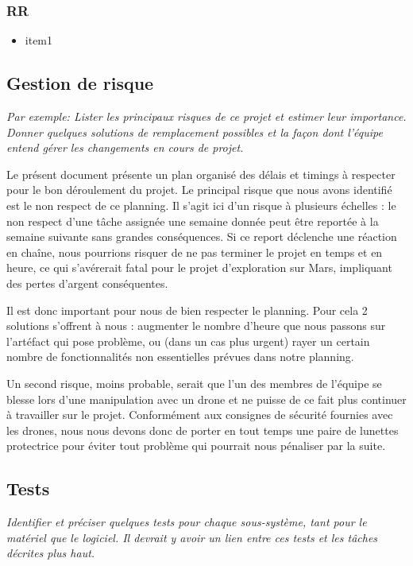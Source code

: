 \documentclass{mistcoursedoc}
\begin{document}
\subsubsection{RR}
\begin{itemize}
  \item item1
\end{itemize}

\subsection{Gestion de risque}

\textit{Par exemple: Lister les principaux risques de ce projet et estimer leur importance.  Donner quelques solutions de remplacement possibles et la façon dont l’équipe entend gérer les changements en cours de projet.}

Le présent document présente un plan organisé des délais et timings à respecter pour le bon déroulement du projet. Le principal risque que nous avons identifié est le non respect de ce planning. Il s'agit ici d'un risque à plusieurs échelles : le non respect d'une tâche assignée une semaine donnée peut être reportée à la semaine suivante sans grandes conséquences. Si ce report déclenche une réaction en chaîne, nous pourrions risquer de ne pas terminer le projet en temps et en heure, ce qui s'avérerait fatal pour le projet d'exploration sur Mars, impliquant des pertes d'argent conséquentes.

Il est donc important pour nous de bien respecter le planning. Pour cela 2 solutions s'offrent à nous : augmenter le nombre d'heure que nous passons sur l'artéfact qui pose problème, ou (dans un cas plus urgent) rayer un certain nombre de fonctionnalités non essentielles prévues dans notre planning.

Un second risque, moins probable, serait que l'un des membres de l'équipe se blesse lors d'une manipulation avec un drone et ne puisse de ce fait plus continuer à travailler sur le projet. Conformément aux consignes de sécurité fournies avec les drones, nous nous devons donc de porter en tout temps une paire de lunettes protectrice pour éviter tout problème qui pourrait nous pénaliser par la suite.

\subsection{Tests}

\textit{Identifier et préciser quelques tests pour chaque sous-système, tant pour le matériel que le logiciel.  Il devrait y avoir un lien entre ces tests et les tâches décrites plus haut.}
\end{document}
